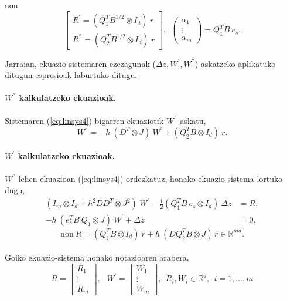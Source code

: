 non 
\begin{equation*}
\begin{bmatrix}
 R^{'}=(Q_1^{T}B^{1/2} \otimes I_d) \ r \\
 R^{''}=(Q_2^{T}B^{1/2} \otimes I_d) \ r
\end{bmatrix}, \ \
\left(
\begin{matrix}
\alpha_1 \\
\vdots \\
\alpha_m
\end{matrix}
\right)=Q_1^TB \ e_s.
\end{equation*}

Jarraian, ekuazio-sistemaren ezezagunak ($\Delta z,W^{'},W^{''}$) askatzeko aplikatuko ditugun espresioak laburtuko ditugu.

\paragraph*{$W^{''}$ kalkulatzeko ekuazioak.}

Sistemaren (\ref{eq:linsys4}) bigarren ekuaziotik $W^{''}$ askatu,
\begin{equation}
\label{eq:W''}
W^{''}= -h \ (D^T \otimes J) \ W^{'}+(Q_2^T B \otimes I_d) \ r.
\end{equation}

\paragraph*{$W^{'}$ kalkulatzeko ekuazioak.}

$W^{''}$ lehen ekuazioan (\ref{eq:linsys4}) ordezkatuz, honako ekuazio-sistema lortuko dugu,
\begin{align*}
(I_m \otimes I_d+ h^2DD^T \otimes J^2) \ W^{'}- \frac{1}{2}(Q_1^T B \ e_s \otimes I_d)\ \Delta z&=R, \\
- h \ (e_s^T B \ Q_1 \otimes J) \ W^{'} + \Delta z &=0,
\end{align*}
\begin{equation}
\label{eq:R}
\text{non} \ R=(Q_1^T B \otimes I_d) \ r + h \  ( D Q_2^T B \otimes J)\,  r \in \mathbb{R}^{md}.
\end{equation}

\paragraph*{}Goiko ekuazio-sistema honako notazioaren arabera,  
\begin{equation*}
R=\begin{bmatrix}
R_1 \\
\vdots \\
R_m
\end{bmatrix}, \ \ \
W^{'}=\begin{bmatrix}
W_1 \\
\vdots \\
W_m
\end{bmatrix}, 
\ \ R_i,W_i \in \mathbb{R}^d, \ \ i=1,\dots,m  
\end{equation*}

